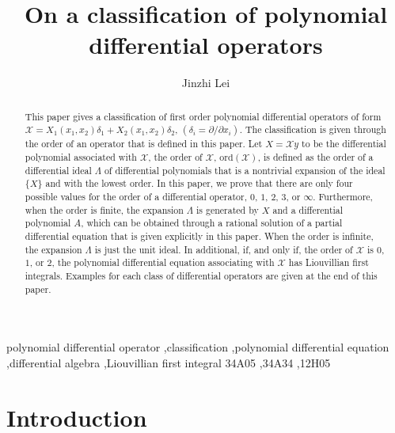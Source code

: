 \documentclass[preprint,12pt]{elsarticle}
\begin{document}
\begin{frontmatter}

\title{On a classification of polynomial differential operators }

\author{Jinzhi Lei }


\address{Zhou Pei-Yuan Center for Applied Mathematics,  Tsinghua University, Beijing, 100084, P.R.China}

\begin{abstract}
This paper gives a classification of first order polynomial differential operators of form $\mathscr{X} = X_1(x_1,x_2)\delta_1 + X_2(x_1,x_2)\delta_2$, $(\delta_i = \partial/\partial x_i)$.  The classification is given through the order of an operator that is defined in this paper.  Let $X=\mathscr{X}y$ to be the differential polynomial associated with $\mathscr{X}$,  the order of $\mathscr{X}$, $\mathrm{ord}(\mathscr{X})$, is defined as the order of a differential ideal $\Lambda$ of differential polynomials that is a nontrivial expansion of the ideal $\{X\}$ and with the lowest order.  In this paper, we prove that there are only four possible values for the  order of a differential operator, $0$, $1$, $2$, $3$, or $\infty$.  Furthermore, when the order is finite,  the expansion $\Lambda$ is generated by $X$ and a differential polynomial $A$, which can be obtained through a rational solution of a partial differential equation that is given explicitly in this paper. When the order is infinite, the expansion $\Lambda$ is just the unit ideal. In additional, if, and only if, the order of $\mathscr{X}$ is $0$, $1$, or $2$, the polynomial differential equation associating with $\mathscr{X}$ has Liouvillian first integrals. Examples for each class of differential operators are given at the end of this paper. 
\end{abstract}

\begin{keyword}
polynomial differential operator \sep classification \sep polynomial differential equation \sep differential algebra \sep Liouvillian first integral
\MSC 34A05 \sep 34A34 \sep 12H05
\end{keyword}

\end{frontmatter}

\section{Introduction}
\label{sec:0}
\end{document}
